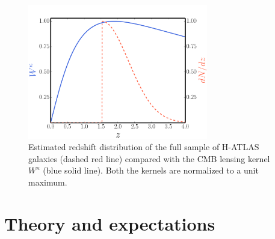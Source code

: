 

\begin{figure} %
\centering %
\includegraphics[width=0.7\textwidth]{Chapter3/Images/f1}
\caption{Estimated redshift distribution of the full sample of H-ATLAS galaxies (dashed red line) compared with the \gls{CMB} lensing kernel $W^{\kappa}$ (blue solid line). Both the kernels are normalized to a unit maximum. \label{fig:kernels_norm}}
\end{figure}


\section{Theory and expectations}
\label{sec:theory_xc1}
